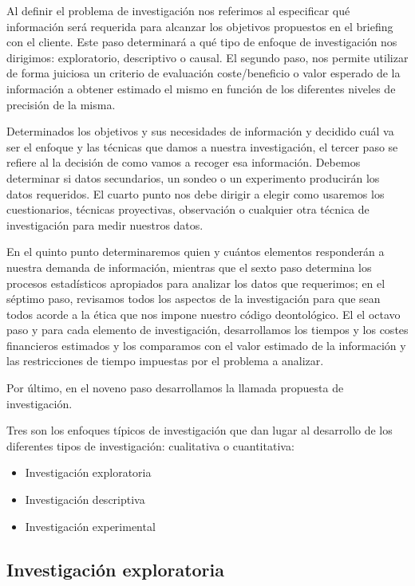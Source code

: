 \documentclass[
]{book}
\providecommand{\tightlist}{%
  \setlength{\itemsep}{0pt}\setlength{\parskip}{0pt}}
\begin{document}
Al definir el problema de investigación nos referimos al especificar qué información será requerida para alcanzar los objetivos propuestos en el briefing con el cliente. Este paso determinará a qué tipo de enfoque de investigación nos dirigimos: exploratorio, descriptivo o causal. El segundo paso, nos permite utilizar de forma juiciosa un criterio de evaluación coste/beneficio o valor esperado de la información a obtener estimado el mismo en función de los diferentes niveles de precisión de la misma.

Determinados los objetivos y sus necesidades de información y decidido cuál va ser el enfoque y las técnicas que damos a nuestra investigación, el tercer paso se refiere al la decisión de como vamos a recoger esa información. Debemos determinar si datos secundarios, un sondeo o un experimento producirán los datos requeridos. El cuarto punto nos debe dirigir a elegir como usaremos los cuestionarios, técnicas proyectivas, observación o cualquier otra técnica de investigación para medir nuestros datos.

En el quinto punto determinaremos quien y cuántos elementos responderán a nuestra demanda de información, mientras que el sexto paso determina los procesos estadísticos apropiados para analizar los datos que requerimos; en el séptimo paso, revisamos todos los aspectos de la investigación para que sean todos acorde a la ética que nos impone nuestro código deontológico. El el octavo paso y para cada elemento de investigación, desarrollamos los tiempos y los costes financieros estimados y los comparamos con el valor estimado de la información y las restricciones de tiempo impuestas por el problema a analizar.

Por último, en el noveno paso desarrollamos la llamada propuesta de investigación.

Tres son los enfoques típicos de investigación que dan lugar al desarrollo de los diferentes tipos de investigación: cualitativa o cuantitativa:

\begin{itemize}
\tightlist
\item
  Investigación exploratoria
\item
  Investigación descriptiva
\item
  Investigación experimental
\end{itemize}

\hypertarget{investigaciuxf3n-exploratoria}{%
\subsection{Investigación exploratoria}\label{investigaciuxf3n-exploratoria}}
\end{document}
